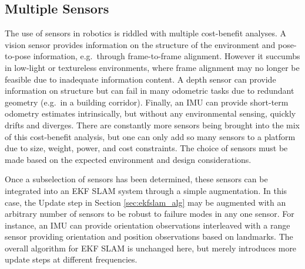 \subsection{Multiple Sensors}
The use of sensors in robotics is riddled with multiple cost-benefit analyses. A vision sensor provides information on the structure of the environment and pose-to-pose information, e.g.\ through frame-to-frame alignment. However it succumbs in low-light or textureless environments, where frame alignment may no longer be feasible due to inadequate information content. A depth sensor can provide information on structure but can fail in many odometric tasks due to redundant geometry (e.g.\ in a building corridor). Finally, an IMU can provide short-term odometry estimates intrinsically, but without any environmental sensing, quickly drifts and diverges. There are constantly more sensors being brought into the mix of this cost-benefit analysis, but one can only add so many sensors to a platform due to size, weight, power, and cost constraints. The choice of sensors must be made based on the expected environment and design considerations.

Once a subselection of sensors has been determined, these sensors can be integrated into an EKF SLAM system through a simple augmentation. In this case, the Update step in Section \ref{sec:ekfslam_alg} may be augmented with an arbitrary number of sensors to be robust to failure modes in any one sensor. For instance, an IMU can provide orientation observations interleaved with a range sensor providing orientation and position observations based on landmarks. The overall algorithm for EKF SLAM is unchanged here, but merely introduces more update steps at different frequencies.

